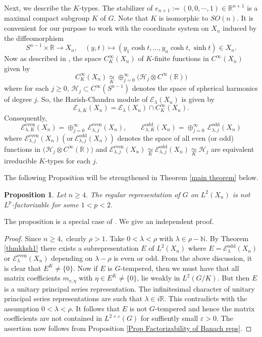 \documentclass[12pt,letterpaper,titlepage,reqno]{amsart}
\theoremstyle{plain}
\newtheorem{prop}[theorem]{Proposition}
\theoremstyle{definition}
\numberwithin{equation}{section}
\newcommand{\Hc}{\mathcal{H}}
\newcommand{\R}{\mathbb{R}}
\newcommand{\even}{\operatorname{even}}
\newcommand{\odd}{\operatorname{odd}}
\newcommand{\Ec}{\mathcal{E}}
\begin{document}
Next, we describe the $K$-types. The stabilizer of $e_{n+1}:=(0,0,\cdots, 1)\in \R^{n+1}$ is a maximal compact subgroup $K$ of $G$. Note that $K$ is isomorphic to $SO(n)$. It is convenient for our purpose to work with the coordinate system on $X_{n}$ induced by the diffeomorphism
\begin{equation}\label{eq polar coords}
S^{n-1}\times\R{\to} X_{n},\quad (y,t)\mapsto (y_1\cosh t,\dots,y_n\cosh t,\sinh t)\in X_{n}.
\end{equation}
Now as described in \cite[Section 2]{KKS}, the space $C_K^\infty(X_{n})$ of $K$-finite functions in $C^\infty(X_{n})$ given by
$$C_K^\infty(X_{n})\underset{K}{\simeq} \oplus_{j=0}^\infty \big(\Hc_j\otimes C^\infty(\R)\big)$$ where for each $j\geq 0$, $\Hc_j\subset C^\infty(S^{n-1})$ denotes  the space of spherical harmonics of degree $j$. So, the Harish-Chandra module of $\Ec_\lambda(X_{n})$ is given by
$$
\Ec_{\lambda, K}(X_{n})
=\Ec_\lambda(X_{n})\cap C^{\infty}_K(X_{n}).
$$
Consequently,
$$
\Ec_{\lambda,K}^{\even}(X_{n})=\oplus_{j=0}^\infty \,\Ec_{\lambda,j}^{\even}(X_{n}), \qquad
\Ec_{\lambda,K}^{\odd}(X_{n})=\oplus_{j=0}^\infty \,\Ec_{\lambda,j}^{\odd}(X_{n})
$$
where $\Ec_{\lambda,j}^{\even}(X_{n}) (\text{or}~ \Ec_{\lambda,j}^{\odd}(X_{n}))$ denotes the space of all even (or odd) functions in $ \big(\Hc_j\otimes C^\infty(\R)\big)$ and $\Ec_{\lambda,j}^{\even}(X_{n})\underset{K}{\simeq} \Ec_{\lambda,j}^{\odd}(X_{n})\underset{K}{\simeq} \Hc_j$ are equivalent
irreducible $K$-types for each $j$.

\par The following Proposition will be strengthened in Theorem \ref{main theorem} below. \cite[Example 5.10]{BK}

\begin{prop}
Let $n\geq 4.$  The regular representation of $G$ on $L^2(X_{n})$ is not $L^p$-factorizable for some $1<p<2.$
\end{prop}

The proposition is a special case of \cite[Example 5.10]{BK}. We give an independent proof.

\begin{proof}
Since $n\geq 4,$ clearly $\rho>1.$ Take $0<\lambda<\rho$ with $\lambda\in \rho-\mathbb{N}.$ By Theorem \ref{thmkksh1} there exists a subrepresentation $E$ of $L^2(X_{n})$ where $E=\Ec^{\odd}_\lambda(X_{n})$ or $\Ec^{\even}_\lambda(X_{n})$ depending on $\lambda-\rho$ is even or odd. From the above discussion, it is clear that $E^K\neq\{0\}.$ Now if $E$ is $G$-tempered, then we must have that all matrix coefficients $m_{v,\eta}$ with $\eta\in E^{K}\neq\{0\}$, lie weakly in $L^2(G/K).$ But then $E$ is a unitary principal series representation. The infinitesimal character of unitary principal series representations are such that $\lambda\in i\R$. This contradicts with the assumption $0<\lambda<\rho$.
It follows that $E$ is not $G$-tempered and hence the matrix coefficients are not contained in $L^{2+\varepsilon}(G)$ for suffiently small $\varepsilon>0$. The assertion now follows from Proposition \ref{Prop Factorizability of Banach reps}.
\end{proof}
\end{document}
